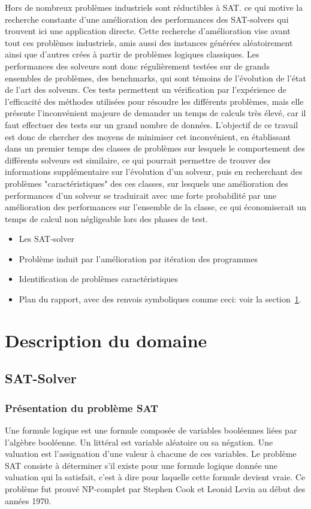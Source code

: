 \documentclass[a4paper,11pt]{article}
\begin{document}
Hors de nombreux problèmes industriels sont réductibles à SAT. ce qui motive la recherche constante d'une amélioration des performances des SAT-solvers qui trouvent ici une application directe. 
Cette recherche d'amélioration vise avant tout ces problèmes industriels, amis aussi des instances générées aléatoirement ainsi que d'autres crées à partir de problèmes logiques classiques. Les performances 
des solveurs sont donc régulièrement testées sur de grands ensembles de problèmes, des benchmarks, qui sont témoins de l'évolution de l'état de l'art des solveurs. Ces tests permettent un vérification par 
l'expérience de l'efficacité des méthodes utilisées pour résoudre les différents problèmes, mais elle présente l'inconvénient majeure de demander un temps de calculs très élevé, car il faut effectuer des tests
sur un grand nombre de données. L'objectif de ce travail est donc de chercher des moyens de minimiser cet inconvénient, en établissant dans un premier temps des classes de problèmes sur lesquels le comportement 
des différents solveurs est similaire, ce qui pourrait permettre de trouver des informations supplémentaire sur l’évolution d'un solveur, 
puis en recherchant des problèmes "caractéristiques" des ces classes, sur lesquels une amélioration des performances d'un solveur se traduirait avec une forte probabilité par 
une amélioration des performances sur l'ensemble de la classe, ce qui économiserait un temps de calcul non négligeable lors des phases de test.


\begin{itemize}
\item Les SAT-solver
\item Problème induit par l'amélioration par itération des programmes
\item Identification de problèmes caractéristiques
\item Plan du rapport, avec des renvois symboliques comme ceci: voir la
  section~\ref{sec:description}.
\end{itemize}

\section{Description du domaine}
\label{sec:description}

\subsection{SAT-Solver}

\subsubsection{Présentation du problème SAT}
Une formule logique est une formule composée de variables booléennes liées par l'algèbre booléenne. Un littéral est variable aléatoire ou sa négation. Une valuation est l'assignation d'une valeur à chacune de ces variables. Le problème SAT consiste à déterminer 
s'il existe pour une formule logique donnée une valuation qui la satisfait, c'est à dire pour laquelle cette formule devient vraie. Ce problème fut prouvé NP-complet par Stephen Cook et Leonid Levin au début 
des années 1970. 
\end{document}
